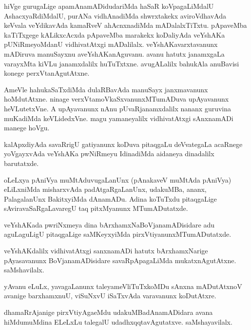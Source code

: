 \documentclass{article}
\begin{document}
\begin{mn}%
hiVge gurugaLige apamAnamADidudariMda haSaR koVpagaLiMdalU AshacxyaRdiMdalU, purANa 
vidhAnadiMda shwrxtakekx aviroVdhavAda keVvala veYdikavAda kamaRveV ahAcnxnadiMda 
mADalalxTiTxtu. pApaveMba  kaTiTxgege kALikxcAcxda pApaveMba marakekx koDaliyAda veYshAKa 
pUNiRmeyoMdanU vidhivatAtxgi mADalilalx. veYshAKavarxtavanunx mADiruva manuSayxnu 
aveYshAKanAguvanu. avanu hatutx janamxgaLa varayxMta kiVLu janamxdalilx huTuTxtxne. 
avugALalilx bahukAla anuBavisi konege perxVtanAgutAtxne.
\end{mn}

\begin{mn}%
AmeVle hahukaSaTxdiMda dulaRBavAda manuSayx janxmavanunx hoMdutAtxne.  ninage 
verxVtamoVkaSxvanunxMTumADuva upAyavanunx heVLutetxVne. A upAyavanunx nAnu 
pUvaRjanamxdalilx nananx guruvina muKadiMda keVLidedxVne. magu yamaneyalilx vidhivatAtxgi 
sAnxnamADi manege hoVgu.
\end{mn}

\begin{mn}%
kalApxdiyAda savaRrigU gatiyanunx koDuva pitaqgaLu deVvategaLa acaRnege yoVgayxvAda 
veYshAKa pwNiRmeyu IdinadiMda aidaneya dinadalilx barutatxde.
\end{mn}

\begin{mn}%
oLeLxya pAniVya muMtAduvugaLanUnx (pAnakaveV muMtAda pAniVya) eLiLxniMda misharxvAda 
padAtgaRgaLanUnx, udakuMBa, ananx, PalagalanUnx BakitxyiMda dAnamADu. Adina koTuTxdu 
pitaqgaLige sAviravaSaRgaLavaregU taq	pitxMyanunx MTumADutatxde.
\end{mn}

\begin{mn}%
veYshAKada pwriNxmeya dina bArxhamxNaBoVjanamADisidare adu aguLaguLigU pitaqgaLige 
saMKeyxyiMda pirxVtiyanunxMTumADutatxde.
\end{mn}

\begin{mn}%
veYshAKdalilx vidhivatAtxgi sanxnamADi hatutx bArxhamxNarige pAyasavanunx 
BoVjanamADisidare savaRpApagaLiMda mukatxnAgutAtxne. saMshavilalx.
\end{mn}

\begin{mn}%
yAvanu eLuLx, yavagaLanunx taleyameVliTuTxkoMDu sAnxna mADutAtxnoV avanige barxhamxnuU, 
viSuNxvU iSaTxvAda varavanunx koDutAtxre.
\end{mn}

\begin{mn}%
dhamaRrAjanige pirxVtiyAgaeMdu udakuMBadAnamADidara avana hiMdumuMdina ELeLxLu talegalU 
udadhxqqtavAgutatxve. saMshayavilalx.
\end{mn}
\end{document}

